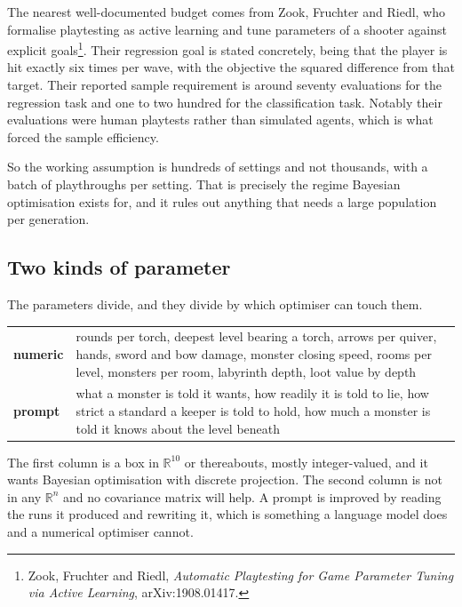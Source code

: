 \documentclass[11pt,a4paper]{article}
\begin{document}
The nearest well-documented budget comes from Zook, Fruchter and Riedl, who formalise playtesting
as active learning and tune parameters of a shooter against explicit
goals\footnote{Zook, Fruchter and Riedl, \emph{Automatic Playtesting for Game Parameter Tuning
via Active Learning}, arXiv:1908.01417.}. Their regression goal is stated concretely, being that
the player is hit exactly six times per wave, with the objective the squared difference from that
target. Their reported sample requirement is around seventy evaluations for the regression task
and one to two hundred for the classification task. Notably their evaluations were human
playtests rather than simulated agents, which is what forced the sample efficiency.

\begin{sectionbox}
So the working assumption is hundreds of settings and not thousands, with a batch of playthroughs
per setting. That is precisely the regime Bayesian optimisation exists for, and it rules out
anything that needs a large population per generation.
\end{sectionbox}

\subsection{Two kinds of parameter}

The parameters divide, and they divide by which optimiser can touch them.

\begin{center}
\begin{tabular}{@{}l@{\hspace{4mm}}>{\raggedright\arraybackslash}p{}@{}}
\toprule
\textbf{numeric} & rounds per torch, deepest level bearing a torch, arrows per quiver, hands,
sword and bow damage, monster closing speed, rooms per level, monsters per room, labyrinth depth,
loot value by depth \\[1mm]
\textbf{prompt}  & what a monster is told it wants, how readily it is told to lie, how strict a
standard a keeper is told to hold, how much a monster is told it knows about the level beneath \\
\bottomrule
\end{tabular}
\end{center}

The first column is a box in $\mathbb{R}^{10}$ or thereabouts, mostly integer-valued, and it
wants Bayesian optimisation with discrete projection. The second column is not in any
$\mathbb{R}^n$ and no covariance matrix will help. A prompt is improved by reading the runs it
produced and rewriting it, which is something a language model does and a numerical optimiser
cannot.
\end{document}

